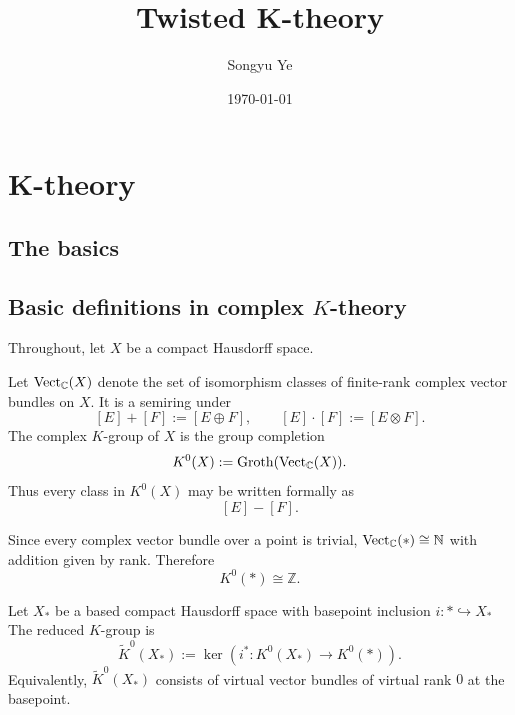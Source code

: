 \documentclass[12pt]{article}
\begin{document}
\rhead{\today}
\cfoot{\thepage}

\title{Twisted K-theory}

\author{Songyu Ye}
\date{\today}
\maketitle


\begin{abstract}

\end{abstract}

\tableofcontents

\section{K-theory}
\subsection{The basics}

\subsection{Basic definitions in complex \(K\)-theory}

Throughout, let \(X\) be a compact Hausdorff space.

\begin{definition}
Let \(\operatorname{Vect}_{\mathbb C}(X)\) denote the set of isomorphism classes of finite-rank complex vector bundles on \(X\). It is a semiring under
\[
[E] + [F] := [E \oplus F],
\qquad
[E]\cdot [F] := [E\otimes F].
\]
The complex \(K\)-group of \(X\) is the group completion
\[
K^0(X) := \mathrm{Groth}(\operatorname{Vect}_{\mathbb C}(X)).
\]
Thus every class in \(K^0(X)\) may be written formally as
\[
[E] - [F].
\]
\end{definition}

\begin{example}
Since every complex vector bundle over a point is trivial, $\operatorname{Vect}_{\mathbb C}(*) \cong \mathbb N$
with addition given by rank. Therefore
\[
K^0(*) \cong \mathbb Z.
\]
\end{example}

\begin{definition}
Let \(X_*\) be a based compact Hausdorff space with basepoint inclusion $i:* \hookrightarrow X_*$
The reduced \(K\)-group is
\[
\widetilde K^0(X_*) :=
\ker\left(i^*:K^0(X_*) \to K^0(*)\right).
\]
Equivalently, \(\widetilde K^0(X_*)\) consists of virtual vector bundles of virtual rank \(0\) at the basepoint.
\end{definition}
\end{document}
